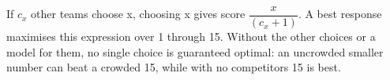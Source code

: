 If $c_x$ other teams choose x, choosing x gives score $\dfrac{x}{(c_x+1)}$. A best response maximises this expression over 1 through 15. Without the other choices or a model for them, no single choice is guaranteed optimal: an uncrowded smaller number can beat a crowded 15, while with no competitors 15 is best.
